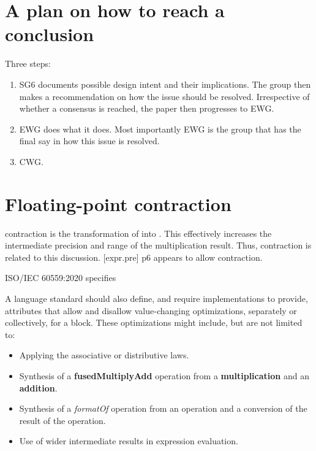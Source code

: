 \section{A plan on how to reach a conclusion}

Three steps:
\begin{enumerate}
  \item SG6 documents possible design intent and their implications.
    The group then makes a recommendation on how the issue should be resolved.
    Irrespective of whether a consensus is reached, the paper then progresses
    to EWG.

  \item EWG does what it does.
    Most importantly EWG is the group that has the final say in how this issue
    is resolved.

  \item CWG.
\end{enumerate}




\section{Floating-point contraction}

\Fp contraction is the transformation of  into
.
This effectively increases the intermediate precision and range of the
multiplication result.
Thus, \fp contraction is related to this discussion.
[expr.pre] p6 appears to allow \fp contraction.

ISO/IEC 60559:2020 specifies
\begin{wgText}
  A language standard should also define, and require implementations to
  provide, attributes that allow and disallow value-changing optimizations,
  separately or collectively, for a block.
  These optimizations might include, but are not limited to:
  \begin{itemize}
    \item Applying the associative or distributive laws.

    \item Synthesis of a \textbf{fusedMultiplyAdd} operation from a \textbf{multiplication} and
      an \textbf{addition}.

    \item Synthesis of a \textit{formatOf} operation from an operation and a conversion
      of the result of the operation.

    \item Use of wider intermediate results in expression evaluation.
  \end{itemize}
\end{wgText}


